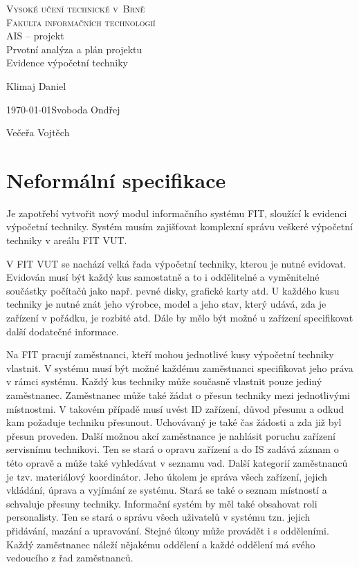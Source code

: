 \documentclass[a4paper,11pt]{article}
\begin{document}
    \begin{titlepage}
	\begin{center}
	    {\Huge\textsc{Vysoké učení technické v~Brně\\}}
	    {\huge\textsc{Fakulta informačních technologií\\}}
	    {\LARGE AIS -- projekt\\}
	    \medskip
	    {\LARGE Prvotní analýza a plán projektu\\}
	    \medskip
	    {\Huge Evidence výpočetní techniky}
	\end{center}
	{\Large \hfill Klimaj Daniel}

	{\Large \today \hfill Svoboda Ondřej}

	{\Large \hfill Večeřa Vojtěch} 
    \end{titlepage} 

    \section*{Neformální specifikace}

    Je zapotřebí vytvořit nový modul informačního systému FIT, sloužící k evidenci výpočetní techniky. Systém musím zajišťovat komplexní správu veškeré výpočetní techniky v areálu FIT VUT.

    V FIT VUT se nachází velká řada výpočetní techniky, kterou je nutné evidovat. Evidován musí být každý kus samostatně a to i oddělitelné a vyměnitelné součástky počítačů jako např. pevné disky, grafické karty atd. U každého kusu techniky je nutné znát jeho výrobce, model a jeho stav, který udává, zda je zařízení v pořádku, je rozbité atd. Dále by mělo být možné u zařízení specifikovat další dodatečné informace.

    Na FIT pracují zaměstnanci, kteří mohou jednotlivé kusy výpočetní techniky vlastnit. V systému musí být možné každému zaměstnanci specifikovat jeho práva v rámci systému. Každý kus techniky může současně vlastnit pouze jediný zaměstnanec. Zaměstnanec může také žádat o přesun techniky mezi jednotlivými místnostmi. V takovém případě musí uvést ID zařízení, důvod přesunu a odkud kam požaduje techniku přesunout. Uchovávaný je také čas žádosti a zda již byl přesun proveden. Další možnou akcí zaměstnance je nahlásit poruchu zařízení servisnímu technikovi. Ten se stará o opravu zařízení a do IS zadává záznam o této opravě a může také vyhledávat v seznamu vad. Další kategorií zaměstnanců je tzv. materiálový koordinátor. Jeho úkolem je správa všech zařízení, jejich vkládání, úprava a vyjímání ze systému. Stará se také o seznam místností a schvaluje přesuny techniky. Informační systém by měl také obsahovat roli personalisty. Ten se stará o správu všech uživatelů v systému tzn. jejich přidávání, mazání a upravování. Stejné úkony může provádět i s odděleními. Každý zaměstnanec náleží nějakému oddělení a každé oddělení má svého vedoucího z řad zaměstnanců. 
\end{document}
